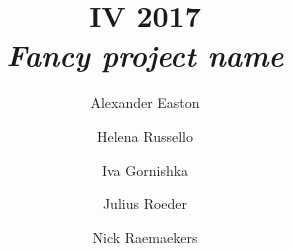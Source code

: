 \documentclass{beamer}
\newcommand{\red}[1]{\textit{\color{red}#1}}
\begin{document}
\title{IV 2017 \\ \red{Fancy project name}}
\author{Alexander Easton \and Helena Russello \and Iva Gornishka \\  \and Julius Roeder \and Nick Raemaekers}
\date{}

  \begin{frame}
    \maketitle     
  \end{frame}
  

\begin{comment}
  \begin{frame}
    \frametitle{Outline}
    \tableofcontents
  \end{frame}
\end{comment}






\end{document}
